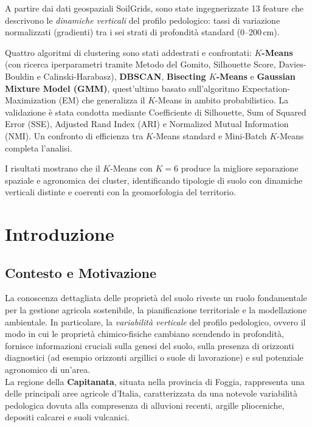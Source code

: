 \documentclass[a4paper,12pt]{article}
\newcommand{\kmeans}{$K$\nobreakdash-Means}
\newcommand{\kval}[1]{$K{=}#1$}
\begin{document}
A partire dai dati geospaziali SoilGrids, sono state ingegnerizzate
13 feature che descrivono le \emph{dinamiche verticali} del profilo
pedologico: tassi di variazione normalizzati
(gradienti) tra i sei strati di profondità standard (0--200\,cm).

Quattro algoritmi di clustering sono stati addestrati e confrontati:
\textbf{\kmeans{}} (con ricerca iperparametri tramite Metodo del Gomito,
Silhouette Score, Davies-Bouldin e Calinski-Harabasz),
\textbf{DBSCAN}, \textbf{Bisecting \kmeans{}} e
\textbf{Gaussian Mixture Model (GMM)}, quest'ultimo basato
sull'algoritmo Expectation-Maximization (EM) che generalizza il \kmeans{}
in ambito probabilistico. La validazione è stata condotta mediante
Coefficiente di Silhouette, Sum of Squared Error (SSE),
Adjusted Rand Index (ARI) e Normalized Mutual Information (NMI).
Un confronto di efficienza tra \kmeans{} standard e Mini-Batch \kmeans{}
completa l'analisi.

I risultati mostrano che il \kmeans{} con \kval{6} produce la migliore
separazione spaziale e agronomica dei cluster, identificando tipologie
di suolo con dinamiche verticali distinte e coerenti con la geomorfologia
del territorio.


\section{Introduzione}
\label{sec:intro}

\subsection{Contesto e Motivazione}

La conoscenza dettagliata delle proprietà del suolo riveste un ruolo
fondamentale per la gestione agricola sostenibile, la pianificazione
territoriale e la modellazione ambientale. In particolare, la
\emph{variabilità verticale} del profilo pedologico, ovvero il modo in
cui le proprietà chimico-fisiche cambiano scendendo in profondità,
fornisce informazioni cruciali sulla genesi del suolo, sulla presenza di
orizzonti diagnostici (ad esempio orizzonti argillici o suole di
lavorazione) e sul potenziale agronomico di un'area.\\
La regione della \textbf{Capitanata}, situata nella provincia di Foggia,
rappresenta una delle principali aree agricole d'Italia, caratterizzata
da una notevole variabilità pedologica dovuta alla compresenza di
alluvioni recenti, argille plioceniche, depositi calcarei e suoli
vulcanici.
\end{document}

